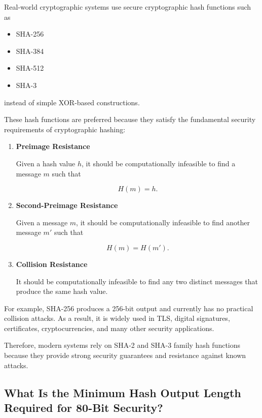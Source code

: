 \documentclass[12pt]{article}
\begin{document}
Real-world cryptographic systems use secure cryptographic hash functions such as

\begin{itemize}
\item SHA-256
\item SHA-384
\item SHA-512
\item SHA-3
\end{itemize}

instead of simple XOR-based constructions.

These hash functions are preferred because they satisfy the fundamental
security requirements of cryptographic hashing:

\begin{enumerate}
\item \textbf{Preimage Resistance}

Given a hash value $h$, it should be computationally infeasible to find a
message $m$ such that

\begin{equation}
H(m)=h.
\end{equation}

\item \textbf{Second-Preimage Resistance}

Given a message $m$, it should be computationally infeasible to find another
message $m'$ such that

\begin{equation}
H(m)=H(m').
\end{equation}

\item \textbf{Collision Resistance}

It should be computationally infeasible to find any two distinct messages
that produce the same hash value.
\end{enumerate}

For example, SHA-256 produces a 256-bit output and currently has no practical
collision attacks. As a result, it is widely used in TLS, digital signatures,
certificates, cryptocurrencies, and many other security applications.

Therefore, modern systems rely on SHA-2 and SHA-3 family hash functions because
they provide strong security guarantees and resistance against known attacks.


\subsection{What Is the Minimum Hash Output Length Required for 80-Bit Security?}
\end{document}
